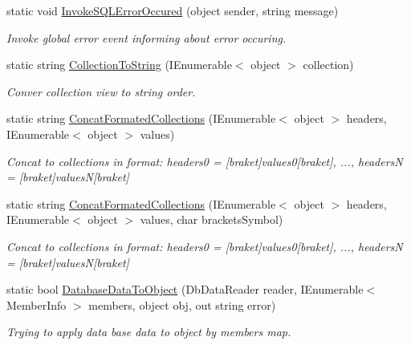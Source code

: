 \begin{DoxyCompactItemize}
\item 
static void \mbox{\hyperlink{class_uniform_data_operator_1_1_sql_1_1_sql_operator_handler_a898993886fbe98ece762f9f7f2af11fb}{Invoke\+S\+Q\+L\+Error\+Occured}} (object sender, string message)
\begin{DoxyCompactList}\small\item\em Invoke global error event informing about error occuring. \end{DoxyCompactList}\item 
static string \mbox{\hyperlink{class_uniform_data_operator_1_1_sql_1_1_sql_operator_handler_ab2de5b9d7f8e8e67b518cf39c7e6f7a5}{Collection\+To\+String}} (I\+Enumerable$<$ object $>$ collection)
\begin{DoxyCompactList}\small\item\em Conver collection view to string order. \end{DoxyCompactList}\item 
static string \mbox{\hyperlink{class_uniform_data_operator_1_1_sql_1_1_sql_operator_handler_a6973169901301adaecd52fab70df280e}{Concat\+Formated\+Collections}} (I\+Enumerable$<$ object $>$ headers, I\+Enumerable$<$ object $>$ values)
\begin{DoxyCompactList}\small\item\em Concat to collections in format\+: headers0 = \mbox{[}braket\mbox{]}values0\mbox{[}braket\mbox{]}, ..., headersN = \mbox{[}braket\mbox{]}valuesN\mbox{[}braket\mbox{]} \end{DoxyCompactList}\item 
static string \mbox{\hyperlink{class_uniform_data_operator_1_1_sql_1_1_sql_operator_handler_ac17e36b29fe5a17281927ab04dbeab26}{Concat\+Formated\+Collections}} (I\+Enumerable$<$ object $>$ headers, I\+Enumerable$<$ object $>$ values, char brackets\+Symbol)
\begin{DoxyCompactList}\small\item\em Concat to collections in format\+: headers0 = \mbox{[}braket\mbox{]}values0\mbox{[}braket\mbox{]}, ..., headersN = \mbox{[}braket\mbox{]}valuesN\mbox{[}braket\mbox{]} \end{DoxyCompactList}\item 
static bool \mbox{\hyperlink{class_uniform_data_operator_1_1_sql_1_1_sql_operator_handler_a97954b0bb1559fbe600c12aa5e2c53ef}{Database\+Data\+To\+Object}} (Db\+Data\+Reader reader, I\+Enumerable$<$ Member\+Info $>$ members, object obj, out string error)
\begin{DoxyCompactList}\small\item\em Trying to apply data base data to object by members map. \end{DoxyCompactList}\end{DoxyCompactItemize}
